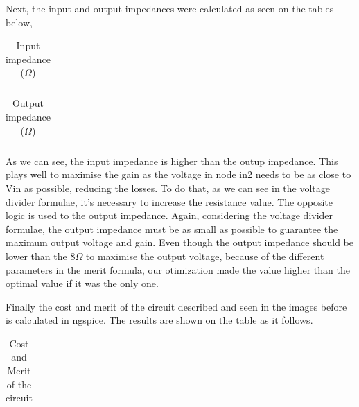 \par Next, the input and output impedances were calculated as seen on the tables below,

\begin{table}[h]
  \centering
  \begin{tabular}{|l|r|}
    \hline    
   
   \end{tabular}
  \caption{Input impedance ($\Omega$)}
    \label{tab:ZI}
\end{table}

\begin{table}[h]
  \centering
  \begin{tabular}{|l|r|}
    \hline    
   
   \end{tabular}
  \caption{Output impedance ($\Omega$)}
  
  \label{tab:ZO}
\end{table}

\par As we can see, the input impedance is higher than the outup impedance. This plays well to maximise the gain as the voltage in node in2 needs to be as close to Vin as possible, reducing the losses. To do that, as we can see in the voltage divider formulae, it's necessary to increase the resistance value. The opposite logic is used to the output impedance. Again, considering the voltage divider formulae, the output impedance must be as small as possible to guarantee the maximum output voltage and gain. Even though the output impedance should be lower than the $8\Omega$ to maximise the output voltage, because of the different parameters in the merit formula, our otimization made the value higher than the optimal value if it was the only one. 

\par Finally the cost and merit of the circuit described and seen in the images before  is calculated in ngspice. The results are shown on the table as it follows.

\begin{table}[ht]
  \centering
  \begin{tabular}{|l|r|}
    \hline    
   
   \end{tabular}
  \caption{Cost and Merit of the circuit}
  \label{tab:cost}
\end{table}

